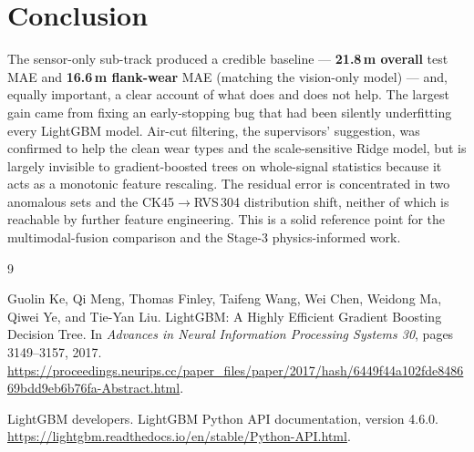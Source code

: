 \documentclass[11pt,a4paper]{article}
\newcommand{\um}{\,\textmu m}
\begin{document}
\section{Conclusion}

The sensor-only sub-track produced a credible baseline --- \textbf{21.8\um{}
overall} test MAE and \textbf{16.6\um{} flank-wear} MAE (matching the
vision-only model) --- and, equally important, a clear account of what does and
does not help. The largest gain came from fixing an early-stopping bug that had
been silently underfitting every LightGBM model. Air-cut filtering, the
supervisors' suggestion, was confirmed to help the clean wear types and the
scale-sensitive Ridge model, but is largely invisible to gradient-boosted trees
on whole-signal statistics because it acts as a monotonic feature rescaling.
The residual error is concentrated in two anomalous sets and the
CK45$\to$RVS\,304 distribution shift, neither of which is reachable by further
feature engineering. This is a solid reference point for the multimodal-fusion
comparison and the Stage-3 physics-informed work.

\begin{thebibliography}{9}

Guolin Ke, Qi Meng, Thomas Finley, Taifeng Wang, Wei Chen, Weidong Ma,
Qiwei Ye, and Tie-Yan Liu.
\newblock LightGBM: A Highly Efficient Gradient Boosting Decision Tree.
\newblock In \emph{Advances in Neural Information Processing Systems 30},
pages 3149--3157, 2017.
\newblock \url{https://proceedings.neurips.cc/paper_files/paper/2017/hash/6449f44a102fde848669bdd9eb6b76fa-Abstract.html}.

LightGBM developers.
\newblock LightGBM Python API documentation, version 4.6.0.
\newblock \url{https://lightgbm.readthedocs.io/en/stable/Python-API.html}.

\end{thebibliography}
\end{document}
